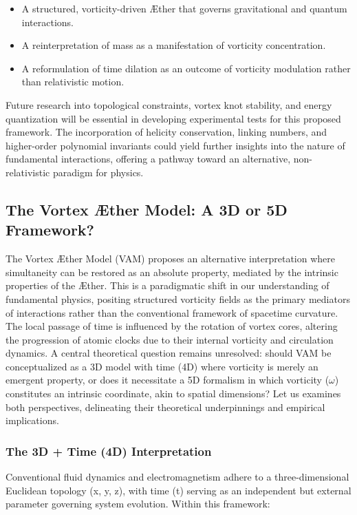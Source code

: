 \begin{itemize}
    \item A structured, vorticity-driven \AE ther that governs gravitational and quantum interactions.
    \item A reinterpretation of mass as a manifestation of vorticity concentration.
    \item A reformulation of time dilation as an outcome of vorticity modulation rather than relativistic motion.
\end{itemize}
Future research into topological constraints, vortex knot stability, and energy quantization will be essential in developing experimental tests for this proposed framework.
The incorporation of helicity conservation, linking numbers, and higher-order polynomial invariants could yield further insights into the nature of fundamental interactions, offering a pathway toward an alternative, non-relativistic paradigm for physics.


\subsection{The Vortex Æther Model: A 3D or 5D Framework?}\label{subsec:the-vortex-ther-model:-a-3d-or-5d-framework?}
The Vortex \AE ther Model (VAM) proposes an alternative interpretation where simultaneity can be restored as an absolute property, mediated by the intrinsic properties of the \AE ther.
This is a paradigmatic shift in our understanding of fundamental physics, positing structured vorticity fields as the primary mediators of interactions rather than the conventional framework of spacetime curvature.
The local passage of time is influenced by the rotation of vortex cores, altering the progression of atomic clocks due to their internal vorticity and circulation dynamics.
A central theoretical question remains unresolved: should VAM be conceptualized as a 3D model with time (4D) where vorticity is merely an emergent property, or does it necessitate a 5D formalism in which vorticity ($\omega$) constitutes an intrinsic coordinate, akin to spatial dimensions?
Let us examines both perspectives, delineating their theoretical underpinnings and empirical implications.

\subsubsection*{The 3D + Time (4D) Interpretation}
Conventional fluid dynamics and electromagnetism adhere to a three-dimensional Euclidean topology (x, y, z), with time (t) serving as an independent but external parameter governing system evolution.
Within this framework:

